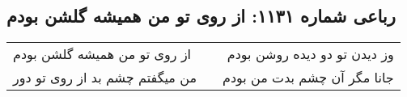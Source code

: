\begin{center}
\section*{رباعی شماره ۱۱۳۱: از روی تو من همیشه گلشن بودم}
\label{sec:1131}
\begin{longtable}{l p{0.5cm} r}
از روی تو من همیشه گلشن بودم
&&
وز دیدن تو دو دیده روشن بودم
\\
من میگفتم چشم بد از روی تو دور
&&
جانا مگر آن چشم بدت من بودم
\\
\end{longtable}
\end{center}
